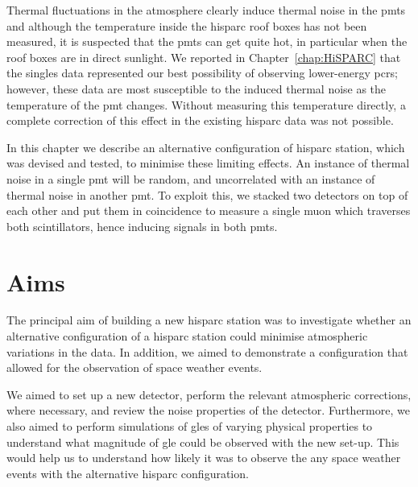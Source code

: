 Thermal fluctuations in the atmosphere clearly induce thermal noise in the \glspl{pmt} and although the temperature inside the \gls{hisparc} roof boxes has not been measured, it is suspected that the \glspl{pmt} can get quite hot, in particular when the roof boxes are in direct sunlight. We reported in Chapter~\ref{chap:HiSPARC} that the singles data represented our best possibility of observing lower-energy \glspl{pcr}; however, these data are most susceptible to the induced thermal noise as the temperature of the \gls{pmt} changes. Without measuring this temperature directly, a complete correction of this effect in the existing \gls{hisparc} data was not possible.

In this chapter we describe an alternative configuration of \gls{hisparc} station, which was devised and tested, to minimise these limiting effects. An instance of thermal noise in a single \gls{pmt} will be random, and uncorrelated with an instance of thermal noise in another \gls{pmt}. To exploit this, we stacked two detectors on top of each other and put them in coincidence to measure a single muon which traverses both scintillators, hence inducing signals in both \glspl{pmt}.




\section{Aims}\label{sec:HS_14008_aims}

The principal aim of building a new \gls{hisparc} station was to investigate whether an alternative configuration of a \gls{hisparc} station could minimise atmospheric variations in the data. In addition, we aimed to demonstrate a configuration that allowed for the observation of space weather events.

We aimed to set up a new detector, perform the relevant atmospheric corrections, where necessary, and review the noise properties of the detector. Furthermore, we also aimed to perform simulations of \glspl{gle} of varying physical properties to understand what magnitude of \gls{gle} could be observed with the new set-up. This would help us to understand how likely it was to observe the any space weather events with the alternative \gls{hisparc} configuration.



